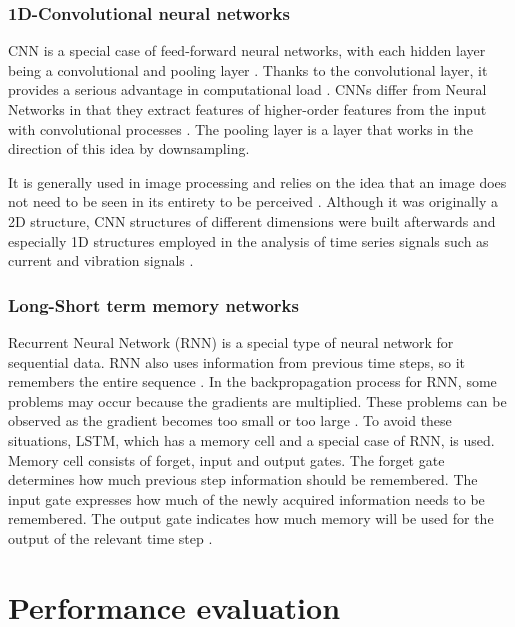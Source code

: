 \subsubsection{1D-Convolutional neural networks}

CNN is a special case of feed-forward neural networks, with each hidden layer being a convolutional and pooling layer \cite{skowron2020convolutional}. Thanks to the convolutional layer, it provides a serious advantage in computational load \cite{skowron2020convolutional}. CNNs differ from Neural Networks in that they extract features of higher-order features from the input with convolutional processes \cite{chen2021improved}. The pooling layer is a layer that works in the direction of this idea by downsampling.

It is generally used in image processing and relies on the idea that an image does not need to be seen in its entirety to be perceived \cite{khan2018review}. Although it was originally a 2D structure, CNN structures of different dimensions were built afterwards and especially 1D structures employed in the analysis of time series signals such as current and vibration signals \cite{eren2019generic}.

\subsubsection{Long-Short term memory networks}

Recurrent Neural Network (RNN) is a special type of neural network for sequential data. RNN also uses information from previous time steps, so it remembers the entire sequence \cite{sabir2019lstm}. In the backpropagation process for RNN, some problems may occur because the gradients are multiplied. These problems can be observed as the gradient becomes too small or too large \cite{sabir2019lstm}. To avoid these situations, LSTM, which has a memory cell and a special case of RNN, is used. Memory cell consists of forget, input and output gates. The forget gate determines how much previous step information should be remembered. The input gate expresses how much of the newly acquired information needs to be remembered. The output gate indicates how much memory will be used for the output of the relevant time step \cite{shenfield2020novel}.

\section{Performance evaluation}

